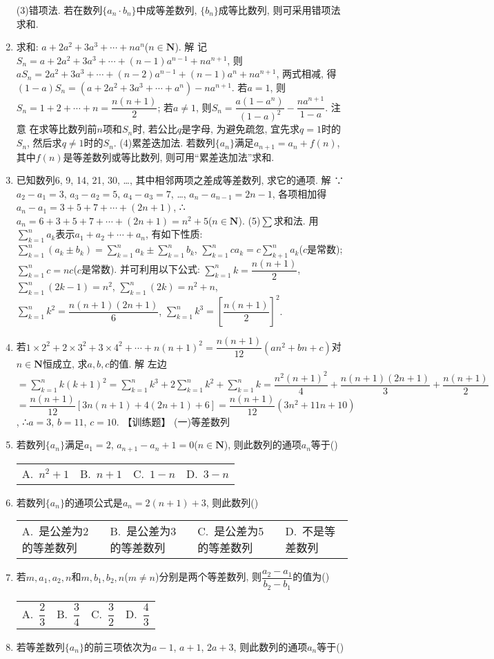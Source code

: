 \documentclass[10pt,a4paper]{article}
\newcommand{\fourch}[4]{\par\begin{tabular}{p{.23\textwidth}p{.23\textwidth}p{.23\textwidth}p{.23\textwidth}}
A.~#1 &B.~#2& C.~#3& D.~#4
\end{tabular}}
\begin{document}
\begin{enumerate}[1.]
(3)错项法.
若在数列$\{a_n\cdot b_n\}$中成等差数列, $\{b_n\}$成等比数列, 则可采用错项法求和.
\item 求和: $a+2a^2+3a^3+\cdots +na^n$($n\in \mathbf{N}$).
解  记$S_n=a+2a^2+3a^3+\cdots +(n-1)a^{n-1}+na^{n+1}$,
则$aS_n=2a^2+3a^3+\cdots +(n-2)a^{n-1}+(n-1)a^n+na^{n+1}$, 两式相减, 得
$(1-a)S_n=(a+2a^2+3a^3+\cdots +a^n)-na^{n+1}$.
若$a=1$, 则$S_n=1+2+\cdots +n=\dfrac{n(n+1)}2$; 若$a\ne 1$, 则$S_n=\dfrac{a(1-{a^n})}{{{(1-a)}^2}}-\dfrac{n{a^{n+1}}}{1-a}$.
注意  在求等比数列前$n$项和$S_n$时, 若公比$q$是字母, 为避免疏忽, 宜先求$q=1$时的$S_n$, 然后求$q\ne 1$时的$S_n$.
(4)累差迭加法.
若数列$\{a_n\}$满足$a_{n+1}=a_n+f(n)$, 其中$f(n)$是等差数列或等比数列, 则可用``累差迭加法''求和.
\item 已知数列6, 9, 14, 21, 30, …, 其中相邻两项之差成等差数列, 求它的通项.
解  ∵$a_2-a_1=3$, $a_3-a_2=5$, $a_4-a_3=7$, …, $a_n-a_{n-1}=2n-1$,
各项相加得$a_n-a_1=3+5+7+\cdots +(2n+1)$,
∴$a_n=6+3+5+7+\cdots +(2n+1)=n^2+5$($n\in \mathbf{N}$).
(5)$\sum$求和法.
用$\sum\limits_{k=1}^na_k$表示$a_1+a_2+\cdots +a_n$, 有如下性质:
$\sum\limits_{k=1}^n(a_k\pm b_k)=\sum\limits_{k=1}^na_k\pm \sum\limits_{k=1}^nb_k$, $\sum\limits_{k=1}^nca_k=c\sum\limits_{k+1}^na_k$($c$是常数); $\sum\limits_{k=1}^nc=nc$($c$是常数).
并可利用以下公式:
$\sum\limits_{k=1}^nk=\dfrac{n(n+1)}2$, $\sum\limits_{k=1}^n(2k-1)=n^2$, $\sum\limits_{k=1}^n(2k)=n^2+n$,
$\sum\limits_{k=1}^nk^2=\dfrac{n(n+1)(2n+1)}6$, $\sum\limits_{k=1}^nk^3=[\dfrac{n(n+1)}2]^2$.
\item 若$1\times 2^2+2\times 3^2+3\times 4^2+\cdots +n(n+1)^2=\dfrac{n(n+1)}{12}(an^2+bn+c)$对$n\in \mathbf{N}$恒成立, 求$a,b,c$的值.
解  左边$=\sum\limits_{k=1}^nk(k+1)^2=\sum\limits_{k=1}^nk^3+2\sum\limits_{k=1}^nk^2+\sum\limits_{k=1}^nk=\dfrac{n^2(n+1)^2}4+\dfrac{n(n+1)(2n+1)}3+\dfrac{n(n+1)}2$
$=\dfrac{n(n+1)}{12}[3n(n+1)+4(2n+1)+6]=\dfrac{n(n+1)}{12}(3n^2+11n+10)$,
∴$a=3$, $b=11$, $c=10$.
【训练题】
(一)等差数列
\item 若数列$\{a_n\}$满足$a_1=2$, $a_{n+1}-a_n+1=0$($n\in \mathbf{N}$), 则此数列的通项$a_n$等于()
\fourch{$n^2+1$}{$n+1$}{$1-n$}{$3-n$}
\item 若数列$\{a_n\}$的通项公式是$a_n=2(n+1)+3$, 则此数列()
\fourch{是公差为2的等差数列}{是公差为3的等差数列}{是公差为5的等差数列}{不是等差数列}
\item 若$m,a_1,a_2,n$和$m,b_1,b_2,n$($m\ne n$)分别是两个等差数列, 则$\dfrac{{a_2}-{a_1}}{{b_2}-{b_1}}$的值为()
\fourch{$\dfrac 23$}{$\dfrac 34$}{$\dfrac 32$}{$\dfrac 43$}
\item 若等差数列$\{a_n\}$的前三项依次为$a-1$, $a+1$, $2a+3$, 则此数列的通项$a_n$等于()

\end{enumerate}
\end{document}
